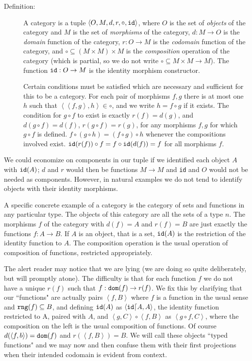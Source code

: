 \documentclass[12pt]{book}
\begin{document}
\begin{description}

\item[Definition:]  A category is a tuple $\left<O,M,d,r,\circ,{\tt id}\right>$, where $O$ is the set of {\em objects\/} of the category and $M$ is the set of {\em morphisms\/} of the category, $d:M \rightarrow O$ is the {\em domain\/} function of the category, $r:O \rightarrow M$ is the {\em codomain\/} function of the category, and $\circ \subseteq (M \times M) \times M$ is the {\em composition\/} operation of the category (which is partial, so we do not write $\circ \subseteq {M \times M} \rightarrow M$). The function ${\tt id}:O \rightarrow M$ is the identity morphism constructor.

Certain conditions must be satisfied which are necessary and sufficient for this to be a category.  For each pair of morphisms $f,g$ there is at most one
$h$ such that $\left<\left<f,g\right>,h\right> \in \circ$, and we write $h=f \circ g$ if it exists.  The condition for $g \circ f$ to exist is exactly $r(f)= d(g)$,
and $d(g \circ f)=d(f)$, $r(g \circ f) = r(g)$, for any morphisms $f,g$ for which $g \circ f$ is defined.
$f\circ (g\circ h) = (f \circ g) \circ h$ whenever the compositions involved exist.  ${\tt id}(r(f)) \circ f = f \circ {\tt id}(d(f)) = f$ for all morphisms $f$.

\end{description}

We could economize on components in our tuple if we identified each object $A$ with ${\tt id}(A)$;  $d$ and $r$ would then be functions $M \rightarrow M$
and {\tt id} and $O$ would not be needed as components.  However, in natural examples we do not tend to identify objects with their identity morphisms.

A specific concrete example of a category is the category of sets and functions in any particular type.  The objects of this category are all the sets of
a type $n$.  The morphisms $f$ of the category with $d(f)=A$ and $r(f)=B$ are just exactly the functions $f:A \rightarrow B$.  If $A$ is an object,
that is a set, ${\tt id}(A)$ is the restriction of the identity function to $A$.  The composition operation is the usual operation of composition of functions, restricted appropriately.

The alert reader may notice that we are lying (we are doing so quite deliberately, but will promptly atone).  The difficulty is that for each function $f$ we do not have a unique $r(f)$ such that $f:{\tt dom}(f) \rightarrow r(f)$.  We fix this by clarifying that our ``functions" are actually pairs $\left<f,B\right>$
where $f$ is a function in the usual sense and  ${\tt rng}(f) \subseteq B$, and defining ${\tt id}(A)$ as $\left<{\tt id} \lceil A,A\right>$, the identity function restricted to A, paired with $A$,
and $\left<g,C\right> \circ \left<f,B\right>$ as $\left<g \circ f,C\right>$, where the composition on the left is the usual composition of functions.  Of course $d(\left<f,b\right>) = {\tt dom}(f)$ and $r(\left<f,B\right>)=B$.  We will call these objects ``typed functions" and we may now and then confuse them with their first projections when their intended codomain is evident from context.
\end{document}
